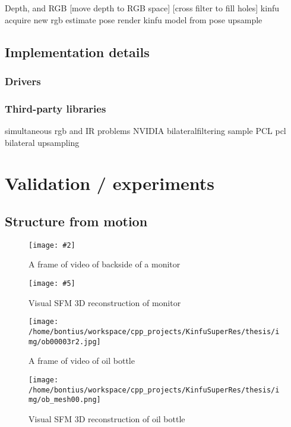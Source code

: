 \documentclass{ucl_thesis}
\newcommand{\myfig}[6]{%
\begin{figure}[h!]\centering%
	\begin{minipage}[b]{0.49\linewidth}\centering%
		\texttt{[image: \#2]}%
		\caption{#3}%
		\label{fig:#1}%
	\end{minipage}%
	\begin{minipage}[b]{0.49\linewidth}\centering%
		\texttt{[image: \#5]}%
		\caption{#6}%
		\label{fig:#4}%
	\end{minipage}%
\end{figure}%
}
\begin{document}
Depth, and RGB
[move depth to RGB space]
[cross filter to fill holes]
kinfu
acquire new rgb
estimate pose
render kinfu model from pose
upsample

\section{Implementation details}
\subsection{Drivers}
\subsection{Third-party libraries}
simultaneous rgb and IR problems
NVIDIA bilateralfiltering sample
PCL
 pcl bilateral upsampling
 \citep{DCBGridStereo}

\chapter{Validation / experiments}
\label{chp:validation}

\section{Structure from motion} 
\label{sec:sfm}

\myfig
{acerlit_1}
{/home/bontius/workspace/cpp_projects/KinfuSuperRes/thesis/img/acer_lit00706.jpg}
{A frame of video of backside of a monitor}
{acerlit_mesh}
{/home/bontius/workspace/cpp_projects/KinfuSuperRes/thesis/img/acer_lit01.png}
{Visual SFM 3D reconstruction of monitor} 

\begin{figure}[h!]\centering
	\begin{minipage}[b]{0.49\linewidth}\centering
		\texttt{[image: /home/bontius/workspace/cpp\_projects/KinfuSuperRes/thesis/img/ob00003r2.jpg]}
		\caption{A frame of video of oil bottle}
		\label{fig:ob_1}
	\end{minipage}
	\begin{minipage}[b]{0.49\linewidth}\centering
		\texttt{[image: /home/bontius/workspace/cpp\_projects/KinfuSuperRes/thesis/img/ob\_mesh00.png]}
		\caption{Visual SFM 3D reconstruction of oil bottle}
		\label{fig:ob_mesh}
	\end{minipage}
\end{figure}
\end{document}
